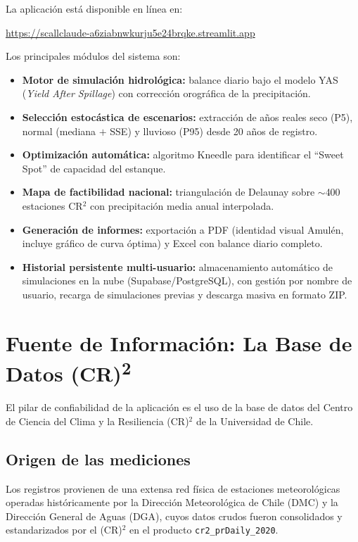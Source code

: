 \documentclass[12pt, a4paper]{article}
\begin{document}
La aplicación está disponible en línea en:
\begin{center}
\url{https://scallclaude-a6ziabnwkurju5e24brqke.streamlit.app}
\end{center}

Los principales módulos del sistema son:

\begin{itemize}
    \item \textbf{Motor de simulación hidrológica:} balance diario bajo el modelo YAS (\textit{Yield After Spillage}) con corrección orográfica de la precipitación.
    \item \textbf{Selección estocástica de escenarios:} extracción de años reales seco (P5), normal (mediana $+$ SSE) y lluvioso (P95) desde 20 años de registro.
    \item \textbf{Optimización automática:} algoritmo Kneedle para identificar el ``Sweet Spot'' de capacidad del estanque.
    \item \textbf{Mapa de factibilidad nacional:} triangulación de Delaunay sobre $\sim$400 estaciones CR$^2$ con precipitación media anual interpolada.
    \item \textbf{Generación de informes:} exportación a PDF (identidad visual Amulén, incluye gráfico de curva óptima) y Excel con balance diario completo.
    \item \textbf{Historial persistente multi-usuario:} almacenamiento automático de simulaciones en la nube (Supabase/PostgreSQL), con gestión por nombre de usuario, recarga de simulaciones previas y descarga masiva en formato ZIP.
\end{itemize}

\section{Fuente de Información: La Base de Datos (CR)\textsuperscript{2}}

El pilar de confiabilidad de la aplicación es el uso de la base de datos del Centro de Ciencia del Clima y la Resiliencia (CR)$^2$ de la Universidad de Chile.

\subsection{Origen de las mediciones}

Los registros provienen de una extensa red física de estaciones meteorológicas operadas históricamente por la Dirección Meteorológica de Chile (DMC) y la Dirección General de Aguas (DGA), cuyos datos crudos fueron consolidados y estandarizados por el (CR)$^2$ en el producto \texttt{cr2\_prDaily\_2020}.
\end{document}
